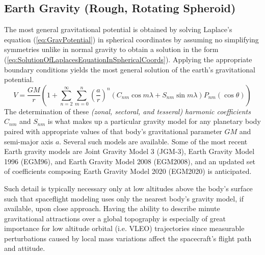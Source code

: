 \documentclass[11pt,dvipsnames]{thesis}
\begin{document}
\subsection{Earth Gravity (Rough, Rotating Spheroid)}
The most general gravitational potential is obtained by solving Laplace's equation (\ref{eq:GravPotential}) in spherical coordinates by assuming no simplifying symmetries unlike in normal gravity to obtain a solution in the form (\ref{eq:SolutionOfLaplacesEquationInSphericalCoords}). Applying the appropriate boundary conditions yields the most general solution of the earth's gravitational potential.
\begin{equation}
V = \frac{GM}{r} \left(1 + \sum_{n = 2}^\infty \sum_{m = 0}^n \left(\frac{a}{r}\right)^{\!n}(C_{nm} \cos m\lambda + S_{nm} \sin m\lambda) P_{nm}(\cos\theta)\right) \label{eq:GravityPotentialSphHarmonics}
\end{equation}
The determination of these \textit{(zonal, sectoral, and tesseral) harmonic coefficients} $C_{nm}$ and $S_{nm}$ is what makes up a particular gravity model for any planetary body paired with appropriate values of that body's gravitational parameter $GM$ and semi-major axis $a$. Several such models are available. Some of the most recent Earth gravity models are Joint Gravity Model 3 (JGM-3), Earth Gravity Model 1996 (EGM96), and Earth Gravity Model 2008 (EGM2008), and an updated set of coefficients composing Earth Gravity Model 2020 (EGM2020) is anticipated.


Such detail is typically necessary only at low altitudes above the body's surface such that spaceflight modeling uses only the nearest body's gravity model, if available, upon close approach.
Having the ability to describe minute gravitational attractions over a global topography is especially of great importance for low altitude orbital (i.e. VLEO) trajectories since measurable perturbations caused by local mass variations affect the spacecraft's flight path and attitude.
\end{document}

